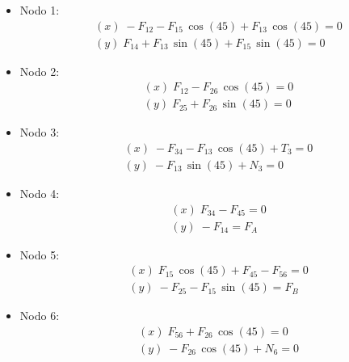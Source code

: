 \documentclass[ 10pt, xcolor = dvipsnames]{beamer}
\begin{document}
\begin{frame}[allowframebreaks]
\frametitle{\insertsection}

\begin{itemize}
\item Nodo 1: 
\begin{align*}
& (x) \; -F_{12} - F_{15} \, \cos(45) + F_{13} \, \cos(45) = 0 \\
& (y) \; F_{14} + F_{13} \, \sin(45) + F_{15} \, \sin(45) = 0
\end{align*}
\item Nodo 2: 
\begin{align*}
& (x) \; F_{12} - F_{26} \, \cos(45) = 0 \\
& (y) \; F_{25} + F_{26} \, \sin(45) = 0
\end{align*}
\item Nodo 3: 
\begin{align*}
& (x) \; -F_{34} - F_{13} \, \cos(45) + T_3 = 0 \\
& (y) \; -F_{13} \, \sin(45) + N_3 = 0
\end{align*}
\framebreak
\item Nodo 4: 
\begin{align*}
& (x) \; F_{34} - F_{45} = 0 \\
& (y) \; -F_{14} = F_A
\end{align*}
\item Nodo 5: 
\begin{align*}
& (x) \; F_{15} \, \cos(45) + F_{45} - F_{56} = 0 \\
& (y) \; -F_{25} - F_{15} \, \sin(45) = F_B
\end{align*}
\item Nodo 6: 
\begin{align*}
& (x) \; F_{56} + F_{26} \, \cos(45) = 0 \\
& (y) \; -F_{26} \, \cos(45) + N_6 = 0
\end{align*}
\end{itemize}

\end{frame}
\end{document}
